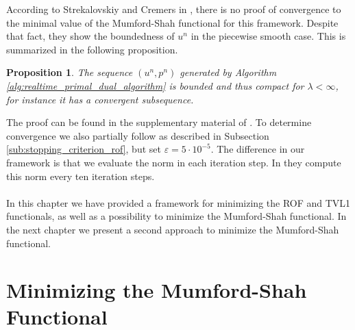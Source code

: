 \documentclass[abstracton]{scrreprt}
\newtheorem{proposition}[theorem]{Proposition}
\begin{document}
            According to Strekalovskiy and Cremers in \cite{Strekalovskiy-Cremers-eccv14}, there is no proof of convergence to the minimal value of the Mumford-Shah functional for this framework. Despite that fact, they show the boundedness of $u^{n}$ in the piecewise smooth case. This is summarized in the following proposition.
            \begin{proposition}
                The sequence $(u^{n}, p^{n})$ generated by Algorithm \ref{alg:realtime_primal_dual_algorithm} is bounded and thus compact for $\lambda < \infty$, for instance it has a convergent subsequence.
            \end{proposition}
            The proof can be found in the supplementary material of \cite{Strekalovskiy-Cremers-eccv14}. To determine convergence we also partially follow \cite{Strekalovskiy-Cremers-eccv14} as described in Subsection \ref{sub:stopping_criterion_rof}, but set $\varepsilon = 5 \cdot 10^{-5}$. The difference in our framework is that we evaluate the norm in each iteration step. In \cite{Strekalovskiy-Cremers-eccv14} they compute this norm every ten iteration steps. \\\\
    In this chapter we have provided a framework for minimizing the ROF and TVL1 functionals, as well as a possibility to minimize the Mumford-Shah functional. In the next chapter we present a second approach to minimize the Mumford-Shah functional.


\chapter{Minimizing the Mumford-Shah Functional} %
\label{cha:minimizing_the_mumford_shah_functional}
\end{document}
